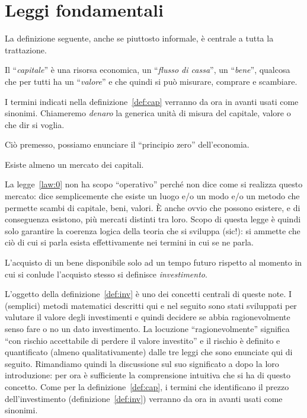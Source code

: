 \chapter{Leggi fondamentali}
\label{chap:Leggi_fondamentali}

La definizione seguente, anche se piuttosto informale, è centrale a tutta la trattazione.
\begin{defn}\label{def:cap}
  Il ``\emph{capitale}'' è una risorsa economica, un ``\emph{flusso di cassa}'', un ``\emph{bene}'',
  qualcosa che per tutti ha un ``\emph{valore}'' e che quindi si può misurare, comprare e scambiare.
\end{defn}
I termini indicati nella definizione~\ref{def:cap} verranno da ora in avanti usati come sinonimi.
Chiameremo \emph{denaro} la generica unità di misura del capitale, valore o che dir si voglia.

Ciò premesso, possiamo enunciare il ``principio zero'' dell'economia. 

\begin{legge}\label{law:0}
  Esiste almeno un mercato dei capitali.
\end{legge}
La legge~\ref{law:0} non ha scopo ``operativo'' perché non dice come si realizza questo mercato: dice
semplicemente che esiste un luogo e/o un modo e/o un metodo che permette scambi di capitale, beni, valori.
È anche ovvio che possono esistere, e di conseguenza esistono, più mercati distinti tra loro. Scopo di questa
legge è quindi solo garantire la coerenza logica della teoria che si sviluppa (sic!): si ammette che ciò di cui
si parla esista effettivamente nei termini in cui se ne parla.

\begin{defn}\label{def:inv}
  L'acquisto di un bene disponibile solo ad un tempo futuro rispetto al momento in cui si conlude
  l'acquisto stesso si definisce \emph{investimento}.
\end{defn}
L'oggetto della definizione~\ref{def:inv} è uno dei concetti centrali di queste note. I (semplici) metodi
matematici descritti qui e nel seguito sono stati sviluppati per valutare il valore degli investimenti e quindi
decidere se abbia ragionevolmente senso fare o no un dato investimento.\newline
La locuzione ``ragionevolmente'' significa ``con rischio accettabile di perdere il valore investito'' e il rischio
è definito e quantificato (almeno qualitativamente) dalle tre leggi che sono enunciate qui di seguito. Rimandiamo
quindi la discussione sul suo significato a dopo la loro introduzione: per ora è sufficiente la comprensione intuitiva
che si ha di questo concetto.\newline
Come per la definizione~\ref{def:cap}, i termini che identificano il prezzo dell'investimento (definizione~\ref{def:inv})
verranno da ora in avanti usati come sinonimi.

